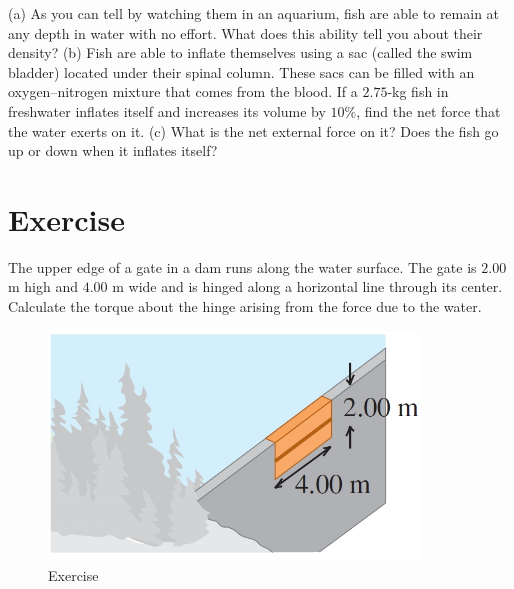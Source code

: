\documentclass[12pt]{article}
\begin{document}
(a) As you can tell by watching
them in an aquarium, fish are able to remain at any depth in water
with no effort. What does this ability tell you about their density?
(b) Fish are able to inflate themselves using a sac (called the swim
bladder) located under their spinal column. These sacs can be
filled with an oxygen–nitrogen mixture that comes from the blood.
If a $2.75$-kg fish in freshwater inflates itself and increases its volume
by $10\%$, find the net force that the water exerts on it. (c) What
is the net external force on it? Does the fish go up or down when it
inflates itself?



 \section*{Exercise \theexample  }
 The upper
 edge of a gate in a dam runs
 along the water surface. The
 gate is $2.00$ m high and $4.00$ m
 wide and is hinged along a horizontal
 line through its center. Calculate the
 torque about the hinge arising
 from the force due to the water.


 \begin{figure}[h!]
    \begin{center}
      \includegraphics[height=2.4in]{images/figure3.jpg}
      \caption{Exercise \theexample }
      \label{1}
    \end{center}
  \end{figure}



 
\end{document}
